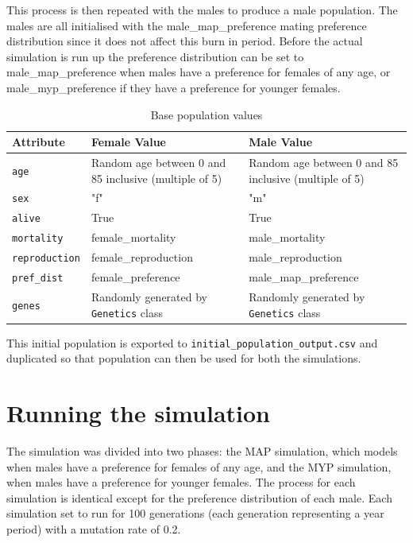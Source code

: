 \documentclass[authoryearcitations]{UoYCSproject}
\begin{document}
This process is then repeated with the males to produce a male population. The males are all initialised with the male\_map\_preference mating preference distribution since it does not affect this burn in period. Before the actual simulation is run up the preference distribution can be set to male\_map\_preference when males have a preference for females of any age, or male\_myp\_preference if they have a preference for younger females. 


\begin{table}[h]
\caption{Base population values}
\label{tbl:basePopulationValues}
\begin{tabular}{m{} m{} m{}}
\textbf{Attribute} & \textbf{Female Value} & \textbf{Male Value} \\\hline
\texttt{age} & Random age between 0 and 85 inclusive (multiple of 5) & Random age between 0 and 85 inclusive (multiple of 5) \\\hline
\texttt{sex} & "f" & "m" \\\hline
\texttt{alive} & True & True \\\hline
\texttt{mortality} & female\_mortality & male\_mortality \\\hline
\texttt{reproduction} & female\_reproduction & male\_reproduction \\\hline
\texttt{pref\_dist} & female\_preference & male\_map\_preference \\\hline 
\texttt{genes} & Randomly generated by \texttt{Genetics} class & Randomly generated by \texttt{Genetics} class
\end{tabular}
\end{table}

This initial population is exported to \texttt{initial\_population\_output.csv} and duplicated so that population can then be used for both the simulations.

\section{Running the simulation}
The simulation was divided into two phases: the MAP simulation, which models when males have a preference for females of any age, and the MYP simulation, when males have a preference for younger females. The process for each simulation is identical except for the preference distribution of each male. Each simulation set to run for 100 generations (each generation representing a year period) with a mutation rate of 0.2.
\end{document}
